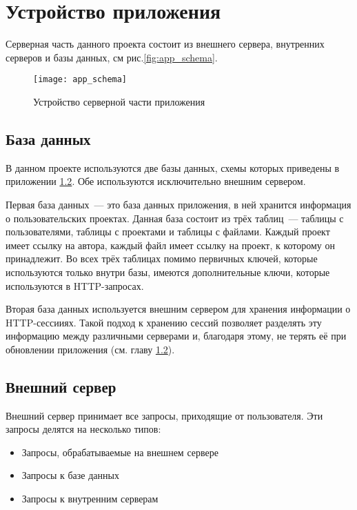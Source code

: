 \chapter{Устройство приложения}
	Серверная часть данного проекта состоит из внешнего сервера, внутренних серверов и базы данных, см рис.\ref{fig:app_schema}.
\begin{figure}[h]
	\label{app_schema}
	\begin{center}
	\texttt{[image: app\_schema]}
	\end{center}
	\caption{Устройство серверной части приложения}
\end{figure}	


\section{База данных}
	В данном проекте используются две базы данных, схемы которых приведены в приложении \ref{}. Обе используются исключительно внешним сервером.
	
	Первая база данных~--- это база данных приложения, в ней хранится информация о пользовательских проектах. Данная база состоит из трёх таблиц~--- таблицы с пользователями, таблицы с проектами и таблицы с файлами. Каждый проект имеет ссылку на автора, каждый файл имеет ссылку на проект, к которому он принадлежит. 
Во всех трёх таблицах помимо первичных ключей, которые используются только внутри базы, имеются дополнительные ключи, которые используются в HTTP-запросах.
	
	Вторая база данных используется внешним сервером для хранения информации о HTTP-сессииях. Такой подход к хранению сессий позволяет разделять эту информацию между различными серверами и, благодаря этому, не терять её при обновлении приложения (см. главу \ref{}). 

	
\section{Внешний сервер}
	Внешний сервер принимает все запросы, приходящие от пользователя. Эти запросы делятся на несколько типов:
\begin{itemize}
	\item Запросы, обрабатываемые на внешнем сервере
	\item Запросы  к базе данных
	\item Запросы к внутренним серверам
\end{itemize}

